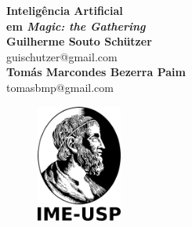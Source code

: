 \documentclass{book}
\begin{document}
  \begin{titlepage}
  \begin{center}
   {\huge\bfseries Inteligência Artificial \\ em \textit{Magic: the Gathering}\\}
   \vspace{1.5cm}
   {\bfseries Guilherme Souto Schützer}\\[5pt]
   guischutzer@gmail.com\\[14pt]
   \vspace{0.5cm}
   {\bfseries Tomás Marcondes Bezerra Paim}\\[5pt]
   tomasbmp@gmail.com\\[14pt]
   \vspace{2cm}
  {\begin{figure}[!h]
          \centering
              \includegraphics[width=0.25\textwidth]{picstcc/ime.png}
  \end{figure}}
   \vspace{0.4cm}
 \end{center}
  \end{titlepage}
\end{document}
